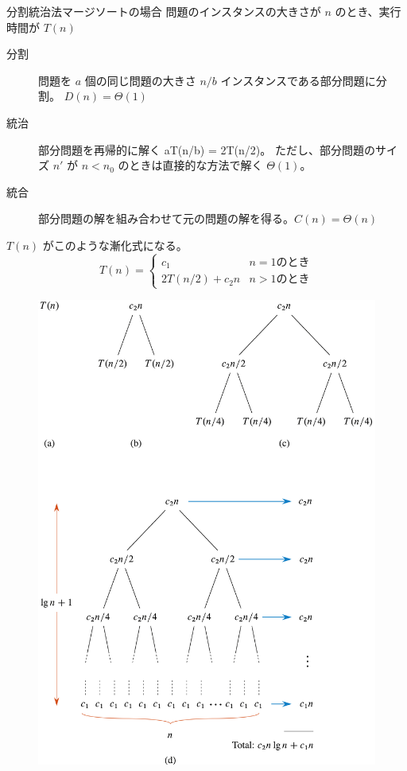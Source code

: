 \documentclass[unicode,11pt,aspectratio=169,notes]{beamer} %
\begin{document}
\begin{frame}{分割統治法}{マージソートの場合}
  問題のインスタンスの大きさが $n$ のとき、実行時間が \alert{$T(n)$}
  \begin{description}
    \item[分割] 問題を $a$ 個の同じ問題の大きさ $n/b$ インスタンスである部分問題に分割。
    \alert{$D(n) = \Theta(1)$}
    \item[統治] 部分問題を再帰的に解く \alert{aT(n/b) = 2T(n/2)}。
    ただし、部分問題のサイズ $n'$ が $n < n_0$ のときは直接的な方法で解く \alert{$\Theta(1)$}。
    \item[統合] 部分問題の解を組み合わせて元の問題の解を得る。\alert{$C(n) = \Theta(n)$}
  \end{description}

  \alert{$T(n)$} がこのような漸化式になる。
  \[
    T(n) = 
    \begin{cases}
      c_1 & n = 1 \text{のとき} \\
      2T(n/2) + c_2n & n > 1 \text{のとき}
    \end{cases}
  \]
\end{frame}

\begin{frame}
  \begin{figure}
    \includegraphics[height=0.95\textheight]{resources/fig02.05}
  \end{figure}
\end{frame}
\end{document}
